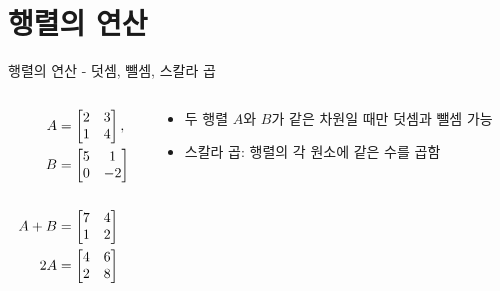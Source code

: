 \documentclass[aspectratio=169]{beamer}
\begin{document}
\section{행렬의 연산 }

\begin{frame}{행렬의 연산 - 덧셈, 뺄셈, 스칼라 곱}
  \begin{columns}
    \begin{column}{0.5\textwidth}
      \begin{align*}
        A &= \begin{bmatrix} 2 & 3 \\ 1 & 4 \end{bmatrix}, \\
        B &= \begin{bmatrix} 5 & 1 \\ 0 & -2 \end{bmatrix} \\
        \vspace{10pt}
        \phantom{blank} \\
        A + B &= \begin{bmatrix} 7 & 4 \\ 1 & 2 \end{bmatrix} \\
        2A &= \begin{bmatrix} 4 & 6 \\ 2 & 8 \end{bmatrix}
      \end{align*}
    \end{column}
    \begin{column}{0.5\textwidth}
      \begin{itemize}
        \item 두 행렬 \( A \)와 \( B \)가 같은 차원일 때만 덧셈과 뺄셈 가능
        \item 스칼라 곱: 행렬의 각 원소에 같은 수를 곱함
      \end{itemize}
    \end{column}
  \end{columns}
\end{frame}
\end{document}

